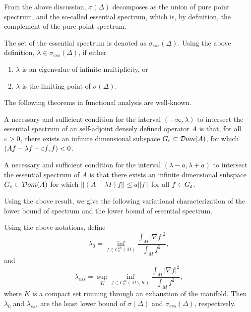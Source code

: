  From the above discussion, $\sigma(\Delta)$ decomposes as the union of pure point spectrum, and the so-called essential spectrum, which is, by definition, the complement of the pure point spectrum.

The set of the essential spectrum is denoted as $\sigma_{ess}(\Delta)$. Using the above definition, $\lambda\in\sigma_{ess}(\Delta)$, if either
\begin{enumerate}
\item $\lambda$ is an eigenvalue of infinite multiplicity, or
\item $\lambda$ is the limiting point of $\sigma(\Delta)$.
\end{enumerate}

The following theorems in functional analysis are well-known. 



\begin{theorem} A necessary and sufficient condition for the interval $(-\infty,\lambda)$ to intersect the essential spectrum of an self-adjoint densely defined operator $A$ is that, for all $\varepsilon>0$, there exists an infinite dimensional subspace $G_\varepsilon\subset \mathcal Dom(A)$, for which $(Af-\lambda f-\varepsilon f,f)<0$.
\end{theorem}


\begin{theorem} A necessary and sufficient condition for the interval $(\lambda-a,\lambda+a)$ to intersect the essential spectrum of $A$ is that 
there exists an infinite dimensional subspace $G_\varepsilon\subset \mathcal Dom(A)$ for which $||(A-\lambda I)f||\leq a||f||$ for all $f\in G_\varepsilon$.
\end{theorem}






Using the above result, we give the following variational characterization of the lower bound of spectrum and  the lower bound of essential spectrum.

\begin{theorem}
Using the above notations, define
\[
\lambda_0=\inf_{f\in C_0^\infty(M)}\frac{\int_M|\nabla f|^2}{\int_M f^2},
\]
and
\[
\lambda_{ess}=\sup_K\inf_{f\in C_0^\infty(M\backslash K)}\frac{\int_M|\nabla f|^2}{\int_M f^2},
\]
where $K$ is a compact set running through an exhaustion of the manifold. Then $\lambda_0$ and $\lambda_{ess}$ are the least lower bound of $\sigma(\Delta)$ and $\sigma_{ess}(\Delta)$, respectively.
\end{theorem}

